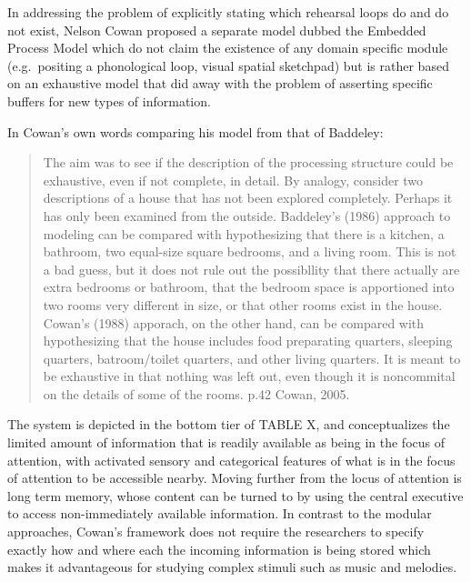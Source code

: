 \documentclass[]{book}
\begin{document}
In addressing the problem of explicitly stating which rehearsal loops do and do not exist, Nelson Cowan proposed a separate model \citep{cowanEvolvingConceptionsMemory1988, cowanWorkingMemoryCapacity2005} dubbed the Embedded Process Model which do not claim the existence of any domain specific module (e.g.~positing a phonological loop, visual spatial sketchpad) but is rather based on an exhaustive model that did away with the problem of asserting specific buffers for new types of information.

In Cowan's own words comparing his model from that of Baddeley:

\begin{quote}
The aim was to see if the description of the processing structure could be exhaustive, even if not complete, in detail. By analogy, consider two descriptions of a house that has not been explored completely. Perhaps it has only been examined from the outside. Baddeley's (1986) approach to modeling can be compared with hypothesizing that there is a kitchen, a bathroom, two equal-size square bedrooms, and a living room. This is not a bad guess, but it does not rule out the possibllity that there actually are extra bedrooms or bathroom, that the bedroom space is apportioned into two rooms very different in size, or that other rooms exist in the house. Cowan's (1988) apporach, on the other hand, can be compared with hypothesizing that the house includes food preparating quarters, sleeping quarters, batroom/toilet quarters, and other living quarters. It is meant to be exhaustive in that nothing was left out, even though it is noncommital on the details of some of the rooms. p.42 Cowan, 2005.
\end{quote}

The system is depicted in the bottom tier of TABLE X, and conceptualizes the limited amount of information that is readily available as being in the focus of attention, with activated sensory and categorical features of what is in the focus of attention to be accessible nearby.
Moving further from the locus of attention is long term memory, whose content can be turned to by using the central executive to access non-immediately available information.
In contrast to the modular approaches, Cowan's framework does not require the researchers to specify exactly how and where each the incoming information is being stored which makes it advantageous for studying complex stimuli such as music and melodies.
\end{document}
